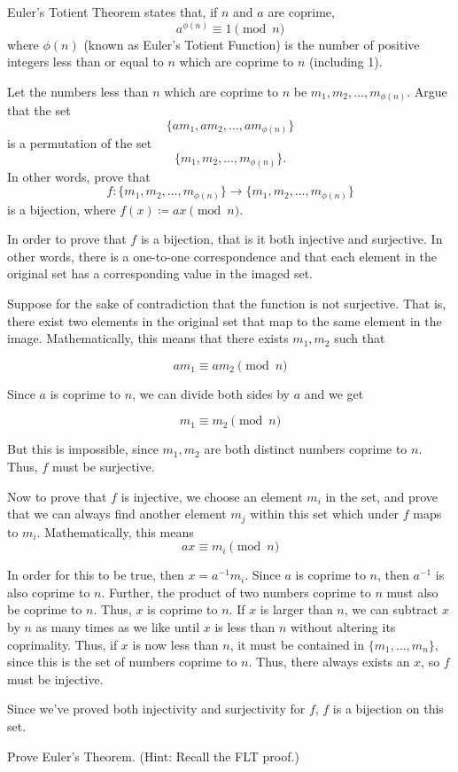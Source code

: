 \documentclass[11pt]{article}
\begin{document}
\pagebreak
{} 
Euler's Totient Theorem states that, if $n$ and $a$ are coprime,
\[
  a^{\phi(n)} \equiv 1 \pmod{n}
\]
where $\phi(n)$ (known as Euler's Totient Function) is the number of positive
integers less than or equal to $n$ which are coprime to $n$ (including 1).

\begin{Parts}
  \Part Let the numbers less than $n$ which are coprime to $n$ be $m_1, m_2, \ldots, m_{\phi(n)}$. 
  Argue that the set
  \[\{am_1, am_2, \ldots, am_{\phi(n)}\}\]
  is a permutation of the set
  \[\{m_1, m_2, \ldots, m_{\phi(n)}\}.\]
  In other words, prove that 
  \[f:\{m_1, m_2, \ldots, m_{\phi(n)}\} \to \{m_1, m_2, \ldots, m_{\phi(n)}\}\]
  is a bijection, where $f(x) \coloneqq ax \pmod{n}$.


  \begin{solution}
    In order to prove that $f$ is a bijection, that is it both injective and surjective. In other words, there is a one-to-one correspondence and that each element in the original set has a corresponding value in the imaged set.

    Suppose for the sake of contradiction that the function is not surjective. That is, there exist two elements in the original set that map to the same element in the image. Mathematically, this means that there exists $m_1, m_2$ such that 

    \[ am_1 \equiv am_2 \pmod n\]
    
    Since $a$ is coprime to $n$, we can divide both sides by $a$ and we get
    
    \[ m_1 \equiv m_2 \pmod n\]

    But this is impossible, since $m_1, m_2$ are both distinct numbers coprime to $n$. Thus, $f$ must be surjective. 

    Now to prove that $f$ is injective, we choose an element $m_i$ in the set, and prove that we can always find another element $m_j$ within this set which under $f$ maps to $m_i$. Mathematically, this means 
    \[ ax \equiv m_i \pmod n\]
    
    In order for this to be true, then $x = a^{-1}m_i$. Since $a$ is coprime to $n$, then $a^{-1}$ is also coprime to $n$. Further, the product of two numbers coprime to $n$ must also be coprime to $n$. Thus, $x$ is coprime to $n$. If $x$ is larger than $n$, we can subtract $x$ by $n$ as many times as we like until $x$ is less than $n$ without altering its coprimality. Thus, if $x$ is now less than $n$, it must be contained in $\{m_1, \dots, m_n\}$, since this is the set of numbers coprime to $n$. Thus, there always exists an $x$, so $f$ must be injective.

    Since we've proved both injectivity and surjectivity for $f$, $f$ is a bijection on this set.
  \end{solution}

  \Part Prove Euler's Theorem. (Hint: Recall the FLT proof.)

  \begin{solution}
    
  \end{solution}


\end{Parts}
\end{document}
